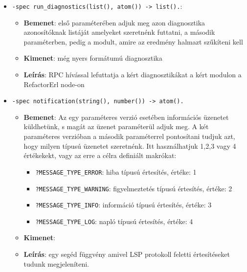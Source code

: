 \begin{itemize}
    
    
    
    \item \lstinline{-spec run_diagnostics(list(), atom()) -> list().}:
    \begin{itemize}
            \item \textbf{Bemenet}:  első paraméterében adjuk meg azon diagnosztika azonosítóknak listáját amelyeket szeretnénk futtatni, a második paraméterben, pedig a modult, amire az eredmény halmazt szűkíteni kell
            \item \textbf{Kimenet}: még nyers formátumú diagnosztika
            \item \textbf{Leírás}: RPC hívással lefuttatja a kért diagnosztikákat a kért modulon a RefactorErl node-on
        \end{itemize}
    
    
    
    
    \item \lstinline{-spec notification(string(), number()) -> atom().} 
        \begin{itemize}
            \item \textbf{Bemenet}: Az egy paraméteres verzió esetében információs üzenetet küldhetünk, s magát az üzenet paraméterül adjuk meg. A két paraméteres verzióban a második paraméterrel pontosítani tudjuk azt, hogy milyen típusú üzenetet szeretnénk. Itt használhatjuk 1,2,3 vagy 4 értékekekt, vagy az erre a célra definiált makrókat:
            \begin{itemize}
                \item \lstinline{?MESSAGE_TYPE_ERROR}: hiba típusú értesítés, értéke: 1
                \item \lstinline{?MESSAGE_TYPE_WARNING}: figyelmeztetés típusú értesítés, értéke: 2
                \item \lstinline{?MESSAGE_TYPE_INFO}: információ típusú értesítés, értéke: 3
                \item \lstinline{?MESSAGE_TYPE_LOG}: napló típusú értesítés, értéke: 4
            \end{itemize}   
            \item \textbf{Kimenet}: 
            \item \textbf{Leírás}: egy segéd függvény amivel LSP protokoll feletti értesítéseket tudunk megjeleníteni. 
        \end{itemize}
    
    
    

\end{itemize}
